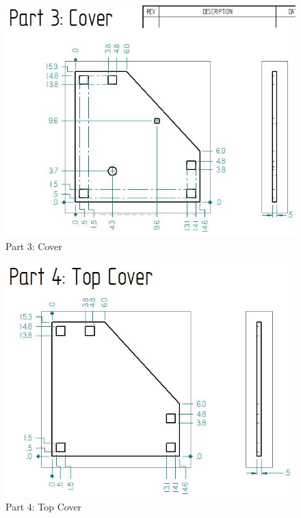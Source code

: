 \documentclass[12pt, titlepage]{article}
\begin{document}
\begin{figure}[H]
    \centerline{\includegraphics[scale=.5]{Part 3.jpg}}
    \caption{Part 3: Cover}
    \label{fig}
\end{figure}

\begin{figure}[H]
    \centerline{\includegraphics[scale=.5]{Part 4.jpg}}
    \caption{Part 4: Top Cover}
    \label{fig}
\end{figure}
\end{document}
